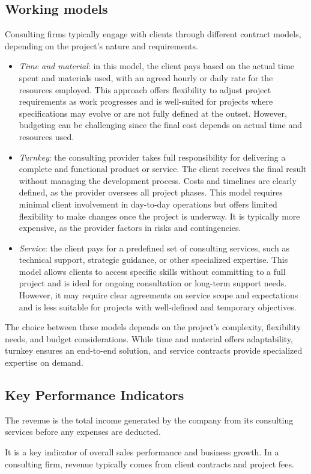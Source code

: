 \subsection{Working models}
Consulting firms typically engage with clients through different contract models, depending on the project's nature and requirements.
\begin{itemize}
    \item \textit{Time and material}: in this model, the client pays based on the actual time spent and materials used, with an agreed hourly or daily rate for the resources employed. 
        This approach offers flexibility to adjust project requirements as work progresses and is well-suited for projects where specifications may evolve or are not fully defined at the outset. 
        However, budgeting can be challenging since the final cost depends on actual time and resources used.
    
    \item \textit{Turnkey}: the consulting provider takes full responsibility for delivering a complete and functional product or service. 
        The client receives the final result without managing the development process. 
        Costs and timelines are clearly defined, as the provider oversees all project phases. 
        This model requires minimal client involvement in day-to-day operations but offers limited flexibility to make changes once the project is underway.
        It is typically more expensive, as the provider factors in risks and contingencies.
    \item \textit{Service}: the client pays for a predefined set of consulting services, such as technical support, strategic guidance, or other specialized expertise. 
        This model allows clients to access specific skills without committing to a full project and is ideal for ongoing consultation or long-term support needs. 
        However, it may require clear agreements on service scope and expectations and is less suitable for projects with well-defined and temporary objectives.
\end{itemize}
\noindent The choice between these models depends on the project's complexity, flexibility needs, and budget considerations.
While time and material offers adaptability, turnkey ensures an end-to-end solution, and service contracts provide specialized expertise on demand.

\subsection{Key Performance Indicators}
\begin{definition}
    The revenue is the total income generated by the company from its consulting services before any expenses are deducted.
\end{definition}
\noindent It is a key indicator of overall sales performance and business growth. 
In a consulting firm, revenue typically comes from client contracts and project fees.

